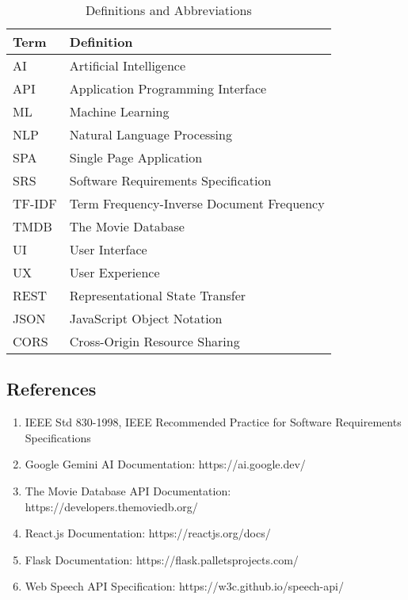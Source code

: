 \documentclass[12pt,a4paper]{article}
\begin{document}
\begin{table}[h]
    \centering
    \begin{tabular}{|l|l|}
        \hline
        \textbf{Term} & \textbf{Definition} \\
        \hline
        AI & Artificial Intelligence \\
        \hline
        API & Application Programming Interface \\
        \hline
        ML & Machine Learning \\
        \hline
        NLP & Natural Language Processing \\
        \hline
        SPA & Single Page Application \\
        \hline
        SRS & Software Requirements Specification \\
        \hline
        TF-IDF & Term Frequency-Inverse Document Frequency \\
        \hline
        TMDB & The Movie Database \\
        \hline
        UI & User Interface \\
        \hline
        UX & User Experience \\
        \hline
        REST & Representational State Transfer \\
        \hline
        JSON & JavaScript Object Notation \\
        \hline
        CORS & Cross-Origin Resource Sharing \\
        \hline
    \end{tabular}
    \caption{Definitions and Abbreviations}
\end{table}

\subsection{References}
\begin{enumerate}
    \item IEEE Std 830-1998, IEEE Recommended Practice for Software Requirements Specifications
    \item Google Gemini AI Documentation: https://ai.google.dev/
    \item The Movie Database API Documentation: https://developers.themoviedb.org/
    \item React.js Documentation: https://reactjs.org/docs/
    \item Flask Documentation: https://flask.palletsprojects.com/
    \item Web Speech API Specification: https://w3c.github.io/speech-api/
\end{enumerate}
\end{document}
